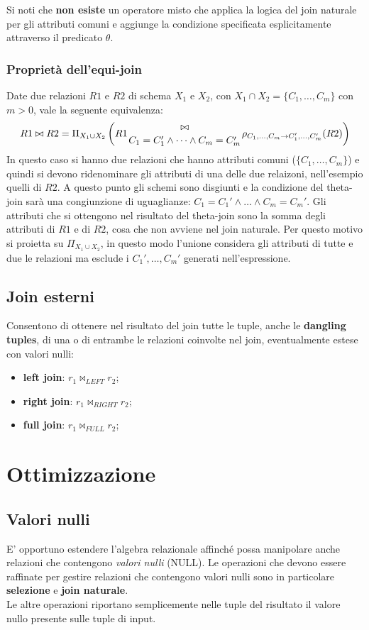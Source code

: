 \documentclass{report}
\begin{document}
Si noti che \textbf{non esiste} un operatore misto che applica la logica del join naturale per gli attributi comuni e aggiunge la condizione specificata esplicitamente attraverso il predicato $\theta$.

\subsubsection{Propriet\`a dell'equi-join}

Date due relazioni $R1$ e $R2$ di schema $X_1$ e $X_2$, con $X_1 \cap X_2 = \{ C_1, \dots, C_m\}$ con $m > 0$, vale la seguente equivalenza:
\[ R1 \bowtie R2 = \Pi_{X_1 \cup X_2} \left(R1 {\bowtie \atop C_1=C_1' \wedge \dots \wedge C_m=C_m'} \rho_{C_1,\dots,C_m \to C_1', \dots, C_m'}(R2)\right) \]
In questo caso si hanno due relazioni che hanno attributi comuni ($\{ C_1, \dots, C_m\}$) e quindi si devono ridenominare gli attributi di una delle due relaizoni, nell'esempio quelli di $R2$. A questo punto gli schemi sono disgiunti e la condizione del theta-join sar\`a una congiunzione di uguaglianze: $C_1=C_1' \wedge \dots \wedge C_m=C_m'$. Gli attributi che si ottengono nel risultato del theta-join sono la somma degli attributi di $R1$ e di $R2$, cosa che non avviene nel join naturale. Per questo motivo si proietta su $\Pi_{X_1\cup X_2}$, in questo modo l'unione considera gli attributi di tutte e due le relazioni ma esclude i $C_1', \dots, C_m'$ generati nell'espressione.

\subsection{Join esterni}
Consentono di ottenere nel risultato del join tutte le tuple, anche le \textbf{dangling tuples}, di una o di entrambe le relazioni coinvolte nel join, eventualmente estese con valori nulli:
\begin{itemize}
	\item \textbf{left join}: $r_1 \bowtie_{LEFT} r_2$;
	\item \textbf{right join}: $r_1 \bowtie_{RIGHT} r_2$;
	\item \textbf{full join}: $r_1 \bowtie_{FULL} r_2$;
\end{itemize}

\section{Ottimizzazione}
\subsection{Valori nulli}
E’ opportuno estendere l’algebra relazionale affinché possa manipolare anche relazioni che contengono \emph{valori nulli} (NULL). Le operazioni che devono essere raffinate per gestire relazioni che contengono valori nulli sono in particolare \textbf{selezione} e \textbf{join naturale}.\\
Le altre operazioni riportano semplicemente nelle tuple del risultato il valore nullo presente sulle tuple di input.
\end{document}
